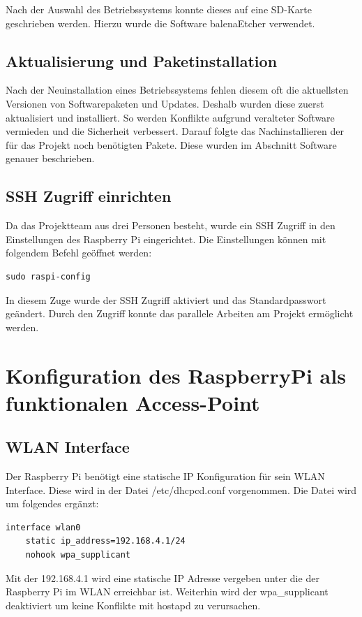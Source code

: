 \documentclass[a4paper,11pt,singlespacing]{article}
\begin{document}
        	Nach der Auswahl des Betriebssystems konnte dieses auf eine SD-Karte geschrieben werden.
        	Hierzu wurde die Software balenaEtcher verwendet.   
    	
    	
    	\subsection{Aktualisierung und Paketinstallation}
        	Nach der Neuinstallation eines Betriebssystems fehlen diesem oft die aktuellsten Versionen von Softwarepaketen und Updates. Deshalb wurden diese zuerst aktualisiert und installiert. So werden Konflikte aufgrund veralteter Software vermieden und die Sicherheit verbessert.  
        	Darauf folgte das Nachinstallieren der für das Projekt noch benötigten Pakete. Diese wurden im Abschnitt Software genauer beschrieben. 
    	
    	
    	\subsection{SSH Zugriff einrichten}
    	Da das Projektteam aus drei Personen besteht, wurde ein SSH Zugriff in den Einstellungen des Raspberry Pi eingerichtet. Die Einstellungen können mit folgendem Befehl geöffnet werden: 
        \begin{lstlisting}
sudo raspi-config
        \end{lstlisting} 
    	
        In diesem Zuge wurde der SSH Zugriff aktiviert und das Standardpasswort geändert. Durch den  Zugriff konnte das parallele Arbeiten am Projekt ermöglicht werden. 
    	\section{Konfiguration des RaspberryPi als funktionalen Access-Point}
            \subsection{WLAN Interface}
                Der Raspberry Pi benötigt eine statische IP Konfiguration für sein WLAN Interface. Diese wird in der Datei /etc/dhcpcd.conf vorgenommen. Die Datei wird um folgendes ergänzt:\\
                \lstset{
                language=bash,
                }
                \begin{lstlisting}
interface wlan0
    static ip_address=192.168.4.1/24
    nohook wpa_supplicant
                \end{lstlisting} 
                Mit der 192.168.4.1 wird eine statische IP Adresse vergeben unter die der Raspberry Pi im WLAN erreichbar ist. Weiterhin wird der wpa{\_}supplicant deaktiviert um keine Konflikte mit hostapd zu verursachen. 
            
\end{document}
